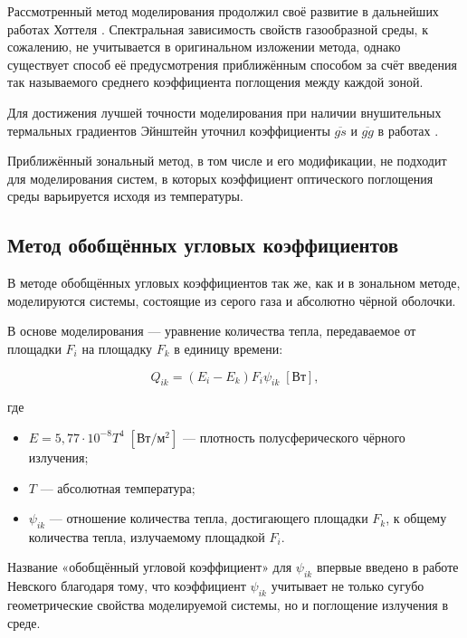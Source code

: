 Рассмотренный метод моделирования продолжил своё развитие в дальнейших работах Хоттеля \cite{hottel-1, hottel-2}.
Спектральная зависимость свойств газообразной среды, к сожалению, не учитывается в оригинальном изложении метода, однако существует способ её предусмотрения приближённым способом за счёт введения так называемого среднего коэффициента поглощения между каждой зоной.

Для достижения лучшей точности моделирования при наличии внушительных термальных градиентов Эйнштейн уточнил коэффициенты $\overline{gs}$ и $\overline{gg}$ в работах \cite{einstein-1, einstein-2}.

Приближённый зональный метод, в том числе и его модификации, не подходит для моделирования систем, в которых коэффициент оптического поглощения среды варьируется исходя из температуры.

\subsection{Метод обобщённых угловых коэффициентов}

В методе обобщённых угловых коэффициентов так же, как и в зональном методе, моделируются системы, состоящие из серого газа и абсолютно чёрной оболочки.

В основе моделирования — уравнение количества тепла, передаваемое от площадки $F_i$ на площадку $F_k$ в единицу времени:

\begin{equation}
	Q_{ik} = (E_i - E_k) F_i \psi_{ik} \; [\text{Вт}],
\end{equation}

\noindent где
\begin{itemize}
	\item $E = 5,77 \cdot 10^{-8} T^4 \; [\text{Вт}/\text{м}^2]$ — плотность полусферического чёрного излучения;
	\item $T$ — абсолютная температура;
	\item $\psi_{ik}$ — отношение количества тепла, достигающего площадки $F_k$, к общему количества тепла, излучаемому площадкой $F_i$.
\end{itemize}

Название «обобщённый угловой коэффициент» для $\psi_{ik}$ впервые введено в работе Невского \cite{nevskiy} благодаря тому, что коэффициент $\psi_{ik}$ учитывает не только сугубо геометрические свойства моделируемой системы, но и поглощение излучения в среде.

